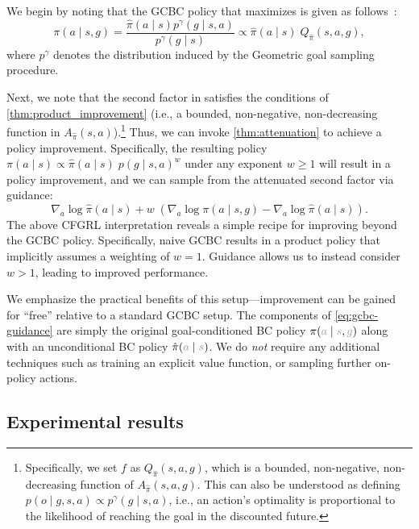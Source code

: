 \documentclass{article}
\newcommand{\pl}[1]{{\color{plgray} #1}}
\begin{document}
We begin by noting that the GCBC policy that maximizes  is given as follows~\citep{crl_eysenbach2022}:
\begin{equation}
    \pi(a \mid s, g) = \frac{\hat \pi(a \mid s)p^\gamma(g \mid s, a)}{p^\gamma(g \mid s)} \propto  \hat \pi(a \mid s) \; Q_{\hat \pi}(s, a, g), \label{eq:gcbc-factored}
\end{equation}
where $p^\gamma$ denotes the distribution induced by the Geometric goal sampling procedure.

Next, we note that the second factor in  satisfies the conditions of \cref{thm:product_improvement} (i.e., a bounded, non-negative, non-decreasing function in $A_{\hat{\pi}}(s, a)$).\footnote{Specifically, we set $f$ as $Q_{\hat \pi}(s, a, g)$, which is a bounded, non-negative, non-decreasing function of $A_{\hat \pi}(s, a, g)$. This can also be understood as defining $p(o \mid g,s,a) \propto p^\gamma(g \mid s,a)$, i.e., an action's optimality is proportional to the likelihood of reaching the goal in the discounted future.}
Thus, we can invoke \cref{thm:attenuation} to achieve a policy improvement.
Specifically,
the resulting policy $\pi(a \mid s) \propto \hat{\pi}(a \mid s) \; p(g \mid s,a)^w$ under any exponent $w \geq 1$ will result in a policy improvement, and we can sample from the attenuated second factor via guidance:
\begin{equation}
\nabla_a \log \hat{\pi}(a \mid s) +  w \;(\nabla_a \log \pi(a \mid s,g) - \nabla_a \log \hat{\pi}(a \mid s)).
\label{eq:gcbc-guidance}
\end{equation}
The above CFGRL interpretation reveals a simple recipe for improving beyond the GCBC policy. Specifically, naive GCBC results in a product policy that implicitly assumes a weighting of $w=1$. Guidance allows us to instead consider $w>1$, leading to improved performance.


We emphasize the practical benefits of this setup---improvement can be gained for ``free'' relative to a standard GCBC setup. The components of \cref{eq:gcbc-guidance} are simply the original goal-conditioned BC policy $\pi(\pl{a} \mid \pl{s}, \pl{g})$ along with an unconditional BC policy $\hat{\pi}(\pl{a} \mid \pl{s})$. We do \emph{not} require any additional techniques such as training an explicit value function, or sampling further on-policy actions.


\subsection{Experimental results}
\end{document}
